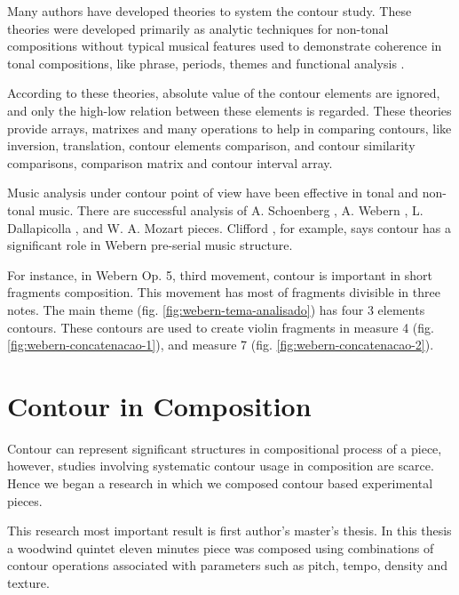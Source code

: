 Many authors
\cite{friedmann85:methodology,friedmann87:response,morris87:composition,morris93:directions,marvin.ea87:relating,marvin88:generalized,marvin.ea95:generalization,polansky.ea92:possible,quinn97:fuzzy,clifford95:contour,beard03:contour}
have developed theories to system the contour study. These theories
were developed primarily as analytic techniques for non-tonal
compositions without typical musical features used to demonstrate
coherence in tonal compositions, like phrase, periods, themes and
functional analysis \cite{beard03:contour}.

According to these theories, absolute value of the contour elements
are ignored, and only the high-low relation between these elements is
regarded.  These theories provide arrays, matrixes and many operations
to help in comparing contours, like inversion, translation, contour
elements comparison, and contour similarity comparisons, comparison
matrix and contour interval array.

Music analysis under contour point of view have been effective in
tonal and non-tonal music. There are successful analysis of A.
Schoenberg \cite{friedmann85:methodology}, A. Webern
\cite{clifford95:contour}, L. Dallapicolla
\cite{marvin88:generalized}, and W. A. Mozart \cite{beard03:contour}
pieces. Clifford \cite{clifford95:contour}, for example, says contour
has a significant role in Webern pre-serial music structure.

For instance, in Webern Op. 5, third movement, contour is important in
short fragments composition. This movement has most of fragments
divisible in three notes. The main theme
(fig. \ref{fig:webern-tema-analisado}) has four 3 elements
contours. These contours are used to create violin fragments in
measure 4 (fig. \ref{fig:webern-concatenacao-1}), and measure 7
(fig. \ref{fig:webern-concatenacao-2}).

\section{Contour in Composition}
\label{sec:contour-composition}

Contour can represent significant structures in compositional process
of a piece, however, studies involving systematic contour usage in
composition are scarce. Hence we began a research in which we composed
contour based experimental pieces.

This research most important result is first author's master's
thesis. In this thesis a woodwind quintet eleven minutes piece was
composed using combinations of contour operations associated with
parameters such as pitch, tempo, density and texture.

